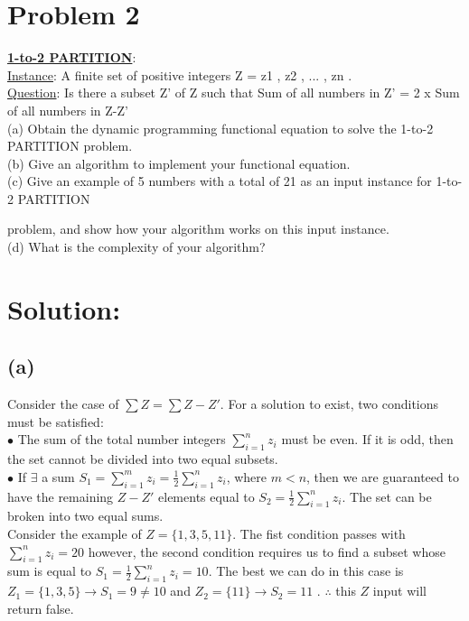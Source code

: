
\section*{Problem 2}
    \textbf{\underline{1-to-2 PARTITION}}:\\
    \underline{Instance}: A finite set of positive integers Z = { z1 , z2 , ... , zn }.\\
    \underline{Question}: Is there a subset Z' of Z such that
    Sum of all numbers in Z' = 2 x Sum of all numbers in Z-Z'\\
    
    \noindent
    (a) Obtain the dynamic programming functional equation to solve the 1-to-2 PARTITION problem.\\
    (b) Give an algorithm to implement your functional equation.\\
    (c) Give an example of 5 numbers with a total of 21 as an input instance for 1-to-2 PARTITION
    
     problem, and show how your algorithm works on this input instance.\\
    (d) What is the complexity of your algorithm?
\section*{Solution:}
	\subsection*{(a)}
		Consider the case of $\sum Z = \sum Z-Z'$. 
		For a solution to exist, two conditions must be satisfied:\\
		$\bullet$ The sum of the total number integers $\sum_{i=1}^{n} z_i$ must be even. 
		If it is odd, then the set cannot be divided into two equal subsets. \\
		$\bullet$ If $\exists$ a sum $S_1 = \sum_{i=1}^{m} z_i = \frac{1}{2}\sum_{i=1}^{n} z_i $, where $m < n$, then we are guaranteed to have the remaining $Z-Z'$ elements equal to $S_2 = \frac{1}{2}\sum_{i=1}^{n} z_i$. 
		The set can be broken into two equal sums.\\
		
		\noindent
		Consider the example of $Z = \{1,3,5,11\}$. 
		The fist condition passes with $\sum_{i=1}^{n} z_i = 20$  however, the second condition requires us to find a subset whose sum is equal to $S_1 = \frac{1}{2}\sum_{i=1}^{n} z_i = 10$. 
		The best we can do in this case is $Z_1 = \{1,3,5\}\rightarrow S_1 = 9\neq 10$ and $Z_2 = \{11\}\rightarrow S_2 = 11$ . 
		$\therefore$ this $Z$ input will return false.\\

